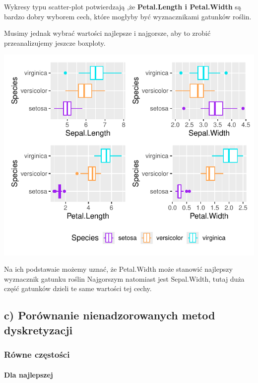\documentclass[
  12pt,
]{article}
\begin{document}
Wykresy typu scatter-plot potwierdzają ,że \textbf{Petal.Length i
Petal.Width} są bardzo dobry wyborem cech, które mogłyby być
wyznacznikami gatunków roślin.

Musimy jednak wybrać wartości najlepsze i najgorsze, aby to zrobić
przeanalizujemy jeszcze boxploty.

\begin{center}\includegraphics{Sprawozdanie2_files/figure-latex/zad1b2-1} \end{center}

Na ich podstawaie możemy uznać, że Petal.Width może stanowić najlepszy
wyznacznik gatunku roślin Najgorszym natomiast jest Sepal.Width, tutaj
duża część gatunków dzieli te same wartości tej cechy.

\subsection{c) Porównanie nienadzorowanych metod
dyskretyzacji}\label{c-poruxf3wnanie-nienadzorowanych-metod-dyskretyzacji}

\subsubsection{Równe częstości}\label{ruxf3wne-czux119stoux15bci}

\paragraph{Dla najlepszej}\label{dla-najlepszej}
\end{document}
